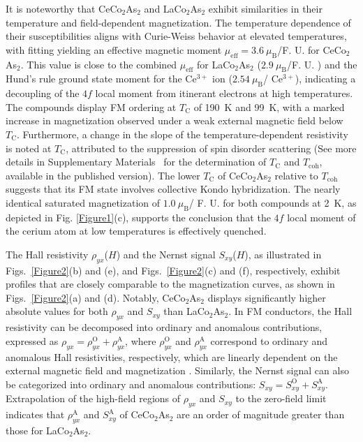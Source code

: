 \documentclass[aps,prl,preprint,superscriptaddress]{revtex4-2}
\begin{document}
It is noteworthy that CeCo$_2$As$_2$ and LaCo$_2$As$_2$ exhibit similarities in their temperature and field-dependent magnetization.
The temperature dependence of their susceptibilities aligns with Curie-Weiss behavior at elevated temperatures, with fitting yielding an effective magnetic moment $\mu_{\mathrm{eff}}=3.6~ \mu_{\mathrm{B}}$/F. U. for CeCo$_2$As$_2$.
This value is close to the combined $\mu_{\mathrm{eff}}$ for LaCo$_2$As$_2$ ($2.9~ \mu_{\mathrm{B}}$/F. U. ) and the Hund's rule ground state moment for the Ce$^{3+}$ ion ($2.54~ \mu_{\mathrm{B}}$/ Ce$^{3+}$), indicating a decoupling of the $4f$ local moment from itinerant electrons at high temperatures.
The compounds display FM ordering at $T_{\mathrm{C}}$ of 190~K and 99~K, with a marked increase in magnetization observed under a weak external magnetic field below $T_{\mathrm{C}}$.
Furthermore, a change in the slope of the temperature-dependent resistivity is noted at $T_{\mathrm{C}}$, attributed to the suppression of spin disorder scattering (See more details in Supplementary Materials~\cite{SM} for the determination of $T_{\mathrm{C}}$ and $T_{\mathrm{coh}}$, available in the published version).
The lower $T_{\mathrm{C}}$ of CeCo$_2$As$_2$ relative to $T_{\mathrm{coh}}$ suggests that its FM state involves collective Kondo hybridization.
The nearly identical saturated magnetization of $1.0~\mu_{\mathrm{B}}$/ F. U. for both compounds at 2~K, as depicted in Fig. \ref{Figure1}(c), supports the conclusion that the $4f$ local moment of the cerium atom at low temperatures is effectively quenched.


The Hall resistivity $\rho_{yx}$($H$) and the Nernst signal $S_{xy}$($H$), as illustrated in Figs.~\ref{Figure2}(b) and (e), and Figs.~\ref{Figure2}(c) and (f), respectively, exhibit profiles that are closely comparable to the magnetization curves, as shown in Figs.~\ref{Figure2}(a) and (d).
Notably, CeCo$_2$As$_2$ displays significantly higher absolute values for both $\rho_{yx}$ and $S_{xy}$ than LaCo$_2$As$_2$.
In FM conductors, the Hall resistivity can be decomposed into ordinary and anomalous contributions, expressed as $\rho_{yx} = \rho^{\mathrm{O}}_{yx}+\rho^{\mathrm{A}}_{yx}$, where $\rho^{\mathrm{O}}_{yx}$ and $\rho^{\mathrm{A}}_{yx}$ correspond to ordinary and anomalous Hall resistivities, respectively, which are linearly dependent on the external magnetic field and magnetization \cite{RevAHE2010}.
Similarly, the Nernst signal can also be categorized into ordinary and anomalous contributions: $S_{xy} = S^{\mathrm{O}}_{xy}+S^{\mathrm{A}}_{xy}$.
Extrapolation of the high-field regions of $\rho_{yx}$ and $S_{xy}$ to the zero-field limit indicates that  $\rho^{\mathrm{A}}_{yx}$ and $S^{\mathrm{A}}_{xy}$ of CeCo$_2$As$_2$ are an order of magnitude greater than those for LaCo$_2$As$_2$.
\end{document}
